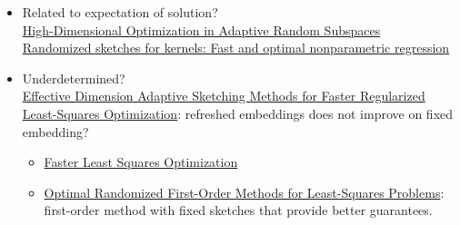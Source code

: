 \documentclass[10pt]{article}
\begin{document}
\begin{itemize}
\item
Related to expectation of solution? \\
\href{https://arxiv.org/pdf/1906.11809v1.pdf}{High-Dimensional Optimization in Adaptive Random Subspaces} \\
\href{https://projecteuclid.org/journals/annals-of-statistics/volume-45/issue-3/Randomized-sketches-for-kernels-Fast-and-optimal-nonparametric-regression/10.1214/16-AOS1472.full}{Randomized sketches for kernels: Fast and optimal nonparametric regression}

\item
Underdetermined? \\
\href{https://arxiv.org/pdf/2006.05874.pdf}{Effective Dimension Adaptive Sketching Methods for Faster Regularized Least-Squares Optimization}: refreshed embeddings does not improve on fixed embedding?
\begin{itemize}
\item
\href{https://arxiv.org/pdf/1911.02675.pdf}{Faster Least Squares Optimization}
\item
\href{https://proceedings.mlr.press/v119/lacotte20a/lacotte20a.pdf}{Optimal Randomized First-Order Methods for Least-Squares Problems}: first-order method with fixed sketches that provide better guarantees.
\end{itemize}

\end{itemize}



\newpage



\end{document}
